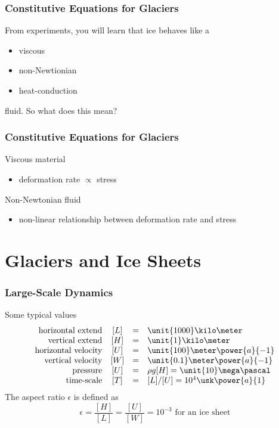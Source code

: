 \documentclass[hide notes,intlimits]{beamer}
\begin{document}
\begin{frame}
  \frametitle{Constitutive Equations for Glaciers}
  From experiments, you will learn that ice behaves like a
  \begin{itemize}
    \item viscous
    \item non-Newtionian
    \item heat-conduction
 \end{itemize}
fluid. So what does this mean?
\end{frame}

\begin{frame}
  \frametitle{Constitutive Equations for Glaciers}
  \begin{block}{Viscous material}
 \begin{itemize}
    \item deformation rate $\propto$ stress
\end{itemize}
 \end{block}
  \begin{block}{Non-Newtonian fluid}
 \begin{itemize}
    \item non-linear relationship between deformation rate and stress
\end{itemize}
 \end{block}
\end{frame}

\section{Glaciers and Ice Sheets}

\begin{frame}
  \frametitle{Large-Scale Dynamics}
  Some typical values
  \begin{equation*}
  \begin{array}{rccl}
    \text{horizontal extend} &  [L] & = & \unit{1000}\kilo\meter\\
    \text{vertical extend} & [H] & = & \unit{1}\kilo\meter \\
    \text{horizontal velocity} & [U] & = & \unit{100}\meter\power{a}{-1}\\
    \text{vertical velocity} & [W] & = & \unit{0.1}\meter\power{a}{-1}\\
    \text{pressure} & [U] & = & \rho g[H] = \unit{10}\mega\pascal\\
    \text{time-scale} & [T] & = &[L]/[U] = 10^{4}\usk\power{a}{1}\\
  \end{array}
  \end{equation*}
  The aspect ratio $\epsilon$ is defined as
  \begin{equation*}
    \epsilon = \frac{[H]}{[L]} = \frac{[U]}{[W]} = 10^{-3} \text{ for an ice sheet}
  \end{equation*}
\end{frame}
\end{document}

